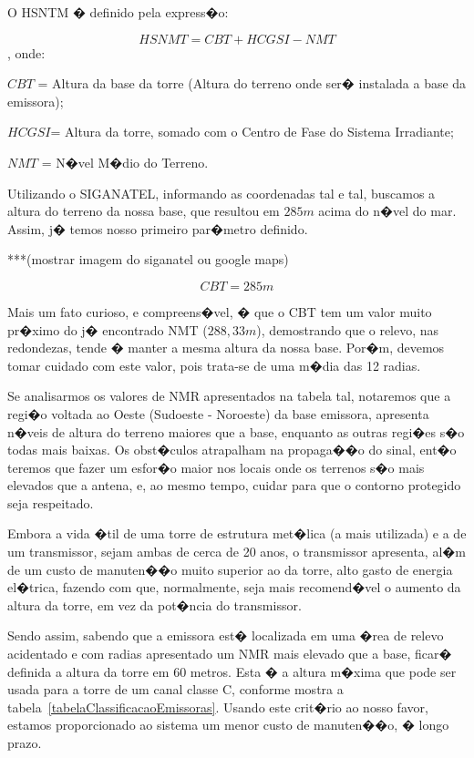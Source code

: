 O HSNTM � definido pela express�o:

$$ HSNMT = CBT + HCGSI - NMT $$, onde:

$CBT$ = Altura da base da torre (Altura do terreno onde ser� instalada a base da emissora);

$HCGSI$= Altura da torre, somado com o Centro de Fase do Sistema Irradiante;

$NMT$ = N�vel M�dio do Terreno.


Utilizando o SIGANATEL, informando as coordenadas tal e tal, buscamos a altura do terreno da nossa base, que resultou em $285 m$ acima do n�vel do mar. 
Assim, j� temos nosso primeiro par�metro definido.

***(mostrar imagem do siganatel ou google maps)

$$CBT = 285m$$

Mais um fato curioso, e compreens�vel, � que o CBT tem um valor muito pr�ximo do j� encontrado NMT ($288,33 m$), demostrando que o relevo, nas redondezas, 
tende
 � manter a mesma altura da
nossa base. Por�m, devemos tomar cuidado com este valor, pois trata-se de uma m�dia das 12 radias.

Se analisarmos os valores de NMR apresentados na tabela tal, notaremos que a regi�o voltada ao
 Oeste (Sudoeste - Noroeste) da base emissora, apresenta n�veis de altura do terreno maiores que a base, enquanto as outras regi�es s�o todas mais baixas.
 Os obst�culos atrapalham na propaga��o do sinal,
ent�o teremos que fazer um esfor�o maior nos locais onde os terrenos s�o mais elevados que a antena, e, ao mesmo tempo, cuidar para que o contorno protegido
 seja respeitado.

Embora a vida �til de uma torre de estrutura met�lica (a mais utilizada) e a de um transmissor, sejam ambas de cerca de 20 anos, o transmissor apresenta, 
al�m de um custo de manuten��o
muito superior ao da torre, alto gasto de energia el�trica, fazendo com que, normalmente, seja mais recomend�vel o aumento da altura da torre, em vez da 
pot�ncia do transmissor.

Sendo assim, sabendo que a emissora est� localizada em uma �rea de relevo acidentado e com radias apresentado um NMR mais elevado que a base, ficar� definida a altura da torre
 em 60 metros. Esta � a altura m�xima que pode ser usada para a torre de um canal classe C, conforme mostra a tabela~\ref{tabelaClassificacaoEmissoras}. 
Usando este crit�rio 
ao nosso favor, estamos proporcionado ao sistema um menor custo de manuten��o, � longo prazo.


